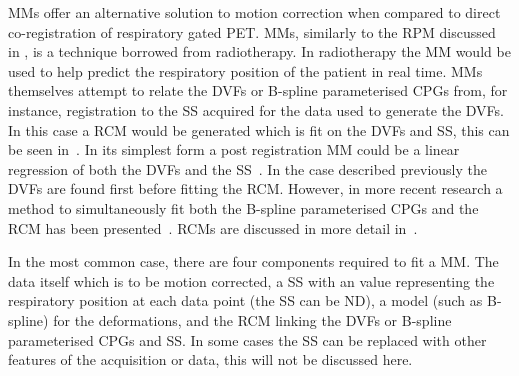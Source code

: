             \glspl{MM} offer an alternative solution to motion correction when compared to direct co-registration of respiratory gated \gls{PET}. \glspl{MM}, similarly to the \gls{RPM} discussed in , is a technique borrowed from radiotherapy. In radiotherapy the \gls{MM} would be used to help predict the respiratory position of the patient in real time. \glspl{MM} themselves attempt to relate the \glspl{DVF} or B-spline parameterised \glspl{CPG} from, for instance, registration to the \gls{SS} acquired for the data used to generate the \glspl{DVF}. In this case a \gls{RCM} would be generated which is fit on the \glspl{DVF} and \gls{SS}, this can be seen in~. In its simplest form a post registration \gls{MM} could be a linear regression of both the \glspl{DVF} and the \gls{SS}~\parencite{Kim1997MotionModel}. In the case described previously the \glspl{DVF} are found first before fitting the \gls{RCM}. However, in more recent research a method to simultaneously fit both the B-spline parameterised \glspl{CPG} and the \gls{RCM} has been presented~\parencite{McClelland2006, McClelland2013, McClelland2014, McClelland2017}. \glspl{RCM} are discussed in more detail in~.
            
            In the most common case, there are four components required to fit a \gls{MM}. The data itself which is to be motion corrected, a \gls{SS} with an value representing the respiratory position at each data point (the \gls{SS} can be \gls{ND}), a model (such as B-spline) for the deformations, and the \gls{RCM} linking the \glspl{DVF} or B-spline parameterised \glspl{CPG} and \gls{SS}. In some cases the \gls{SS} can be replaced with other features of the acquisition or data, this will not be discussed here.
            
